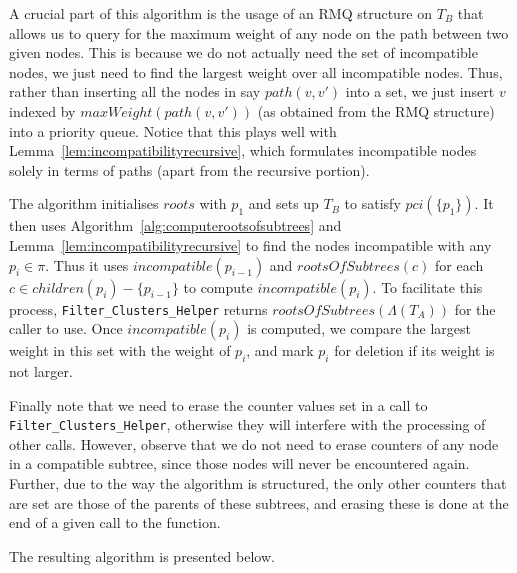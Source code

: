 \documentclass{article}
\newcommand{\leafset}{\Lambda}
\begin{document}
    A crucial part of this algorithm is the usage of an RMQ structure on $T_B$ that allows us to query for the maximum weight of any node on the path between two given nodes. This is because we do not actually need the set of incompatible nodes, we just need to find the largest weight over all incompatible nodes. Thus, rather than inserting all the nodes in say $path(v, v')$ into a set, we just insert $v$ indexed by $maxWeight(path(v, v'))$ (as obtained from the RMQ structure) into a priority queue. Notice that this plays well with Lemma~\ref{lem:incompatibilityrecursive}, which formulates incompatible nodes solely in terms of paths (apart from the recursive portion).

    The algorithm initialises $roots$ with $p_1$ and sets up $T_B$ to satisfy $pci(\{p_1\})$. It then uses Algorithm~\ref{alg:computerootsofsubtrees} and Lemma~\ref{lem:incompatibilityrecursive} to find the nodes incompatible with any $p_i \in \pi$. Thus it uses $incompatible(p_{i-1})$ and $rootsOfSubtrees(c)$ for each $c \in children(p_i) - \{p_{i-1}\}$ to compute $incompatible(p_i)$. To facilitate this process, \texttt{Filter\_Clusters\_Helper} returns $rootsOfSubtrees(\leafset(T_A))$ for the caller to use. Once $incompatible(p_i)$ is computed, we compare the largest weight in this set with the weight of $p_i$, and mark $p_i$ for deletion if its weight is not larger.

    Finally note that we need to erase the counter values set in a call to \texttt{Filter\_Clusters\_Helper}, otherwise they will interfere with the processing of other calls. However, observe that we do not need to erase counters of any node in a compatible subtree, since those nodes will never be encountered again. Further, due to the way the algorithm is structured, the only other counters that are set are those of the parents of these subtrees, and erasing these is done at the end of a given call to the function.

    The resulting algorithm is presented below.
\end{document}
